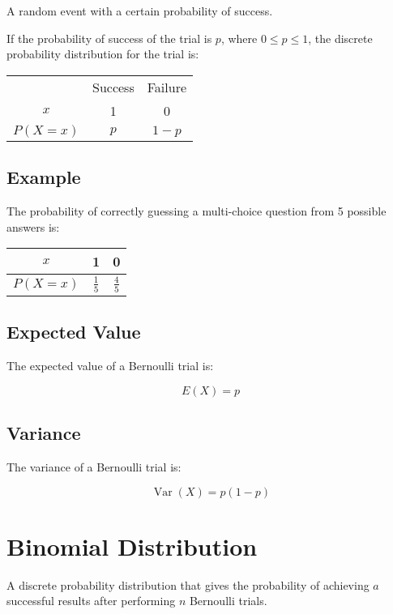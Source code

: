\documentclass[a4paper,11pt]{article}
\DeclareMathOperator\Var{Var}
\begin{document}
A random event with a certain probability of success.

If the probability of success of the trial is $p$, where $0 \leq p \leq 1$, the
discrete probability distribution for the trial is:

\begin{center}
\begin{tabular}{c|c|c}
& Success & Failure \\
$x$ & 1 & 0 \\
\hline
$P(X = x)$ & $p$ & $1 - p$ \\
\end{tabular}
\end{center}


\subsection{Example}

The probability of correctly guessing a multi-choice question from 5 possible
answers is:

\begin{center}
\begin{tabular}{c|c|c}
$x$ & 1 & 0 \\
\hline
$P(X = x)$ & $\frac{1}{5}$ & $\frac{4}{5}$ \\
\end{tabular}
\end{center}


\subsection{Expected Value}

The expected value of a Bernoulli trial is:

$$
E(X) = p
$$


\subsection{Variance}

The variance of a Bernoulli trial is:

$$
\Var(X) = p(1 - p)
$$




\section{Binomial Distribution}

A discrete probability distribution that gives the probability of achieving
$a$ successful results after performing $n$ Bernoulli trials.
\end{document}
